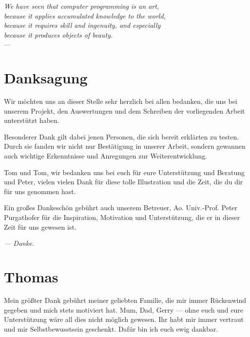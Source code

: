 
\begin{flushright}{\slshape    
    We have seen that computer programming is an art, \\ 
    because it applies accumulated knowledge to the world, \\ 
    because it requires skill and ingenuity, and especially \\
    because it produces objects of beauty.} \\ \medskip
    ---  \citep{knuth:1974}
\end{flushright}

\bigskip

\begingroup
\let\clearpage\relax
\let\cleardoublepage\relax
\let\cleardoublepage\relax
\chapter*{Danksagung}
Wir möchten uns an dieser Stelle sehr herzlich bei allen bedanken, die uns bei unserem Projekt, den Auswertungen und dem Schreiben der vorliegenden Arbeit unterstützt haben. 

Besonderer Dank gilt dabei jenen Personen, die sich bereit erklärten \scribbler zu testen. Durch sie fanden wir nicht nur Bestätigung in unserer Arbeit, sondern gewannen auch wichtige Erkenntnisse und Anregungen zur Weiterentwicklung.

Tom und Tom, wir bedanken uns bei euch für eure Unterstützung und Beratung und Peter, vielen vielen Dank für diese tolle Illustration und die Zeit, die du dir für uns genommen hast.

Ein großes Dankeschön gebührt auch unserem Betreuer, Ao. Univ.-Prof. Peter Purgathofer für die Inspiration, Motivation und Unterstützung, die er in dieser Zeit für uns gewesen ist.

\medskip \noindent \emph{--- Danke.}

\pagebreak

\chapter*{Thomas}
Mein größter Dank gebührt meiner geliebten Familie, die mir immer Rückenwind gegeben und mich stets motiviert hat. Mum, Dad, Gerry --- ohne euch und eure Unterstützung wäre all dies nicht möglich gewesen. Ihr habt mir immer vertraut und mir Selbstbewusstsein geschenkt. Dafür bin ich euch ewig dankbar.

